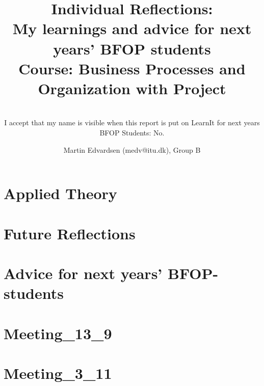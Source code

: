 \documentclass{report}
\title
{
	\textbf{Individual Reflections: \\ My learnings and advice for next years' BFOP students} \\
	\textbf{Course:} Business Processes and Organization with Project
}
\author
{
	Martin Edvardsen (medv@itu.dk), Group B \\
}
\subtitle
{
	~\\
	I accept that my name is visible when this report is put on LearnIt for next years BFOP Students: No.
}
\begin{document}
\maketitle

\chapter{Applied Theory}
	\label{tools}
	
\chapter{Future Reflections}
	\label{future}
	
\chapter{Advice for next years' BFOP-students}
	\label{advice}
	

\nocite{*}



\begin{appendices}
	\chapter{Meeting\_13\_9}
	
	\label{meeting_13_9}
	\chapter{Meeting\_3\_11}
	
	\label{meeting_3_11}
\end{appendices}
\end{document}
